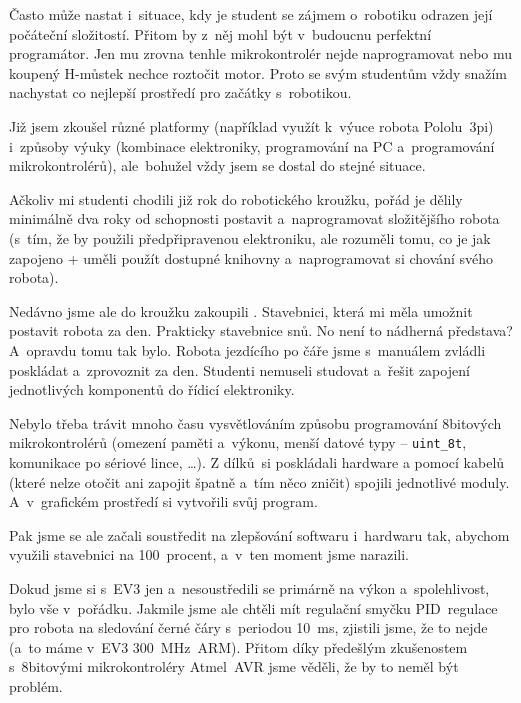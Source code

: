 Často může nastat i~situace, kdy je student se zájmem o~robotiku odrazen její počáteční složitostí.
Přitom by z~něj mohl být v~budoucnu perfektní programátor. 
Jen mu zrovna tenhle mikrokontrolér nejde naprogramovat nebo mu koupený H-můstek nechce roztočit motor.
Proto se svým studentům vždy snažím nachystat co nejlepší prostředí pro začátky s~robotikou. 

Již jsem zkoušel různé platformy (například využít k~výuce robota Pololu~3pi) i~způsoby výuky (kombinace elektroniky, programování na PC a~programování mikrokontrolérů), ale~bohužel vždy jsem se dostal do stejné situace. 

Ačkoliv mi studenti chodili již rok do robotického kroužku, pořád je dělily minimálně dva roky od schopnosti postavit a~naprogramovat složitějšího robota (s~tím, že by použili předpřipravenou elektroniku, ale rozuměli tomu, co je jak zapojeno + uměli použít dostupné knihovny a~naprogramovat si chování svého robota).

Nedávno jsme ale do kroužku zakoupili \legoEV{}. 
Stavebnici, která mi měla umožnit postavit robota za den. 
Prakticky stavebnice snů. No není to nádherná představa?
A~opravdu tomu tak bylo. Robota jezdícího po čáře jsme s~manuálem zvládli poskládat a~zprovoznit za den. 
Studenti nemuseli studovat a~řešit zapojení jednotlivých komponentů do řídicí elektroniky. 

Nebylo třeba trávit mnoho času vysvětlováním způsobu programování 8bitových mikrokontrolérů (omezení paměti a~výkonu, menší datové typy -- \verb|uint_8t|, komunikace po sériové lince, \dots). 
Z dílků~\lega{ }si poskládali hardware a pomocí kabelů (které nelze otočit ani zapojit špatně a~tím něco zničit) spojili jednotlivé moduly. A~v~grafickém prostředí si vytvořili svůj program.
% 
% 
%
%
%
%

Pak jsme se ale začali soustředit na zlepšování softwaru i~hardwaru tak, abychom využili stavebnici na 100~procent, a~v~ten moment jsme narazili.

Dokud jsme si s~EV3 jen  a~nesoustředili se primárně na výkon a~spolehlivost, bylo vše v~pořádku. 
Jakmile jsme ale chtěli mít regulační smyčku PID~regulace pro robota na sledování černé čáry s~periodou 10~ms, zjistili jsme, že to nejde (a~to máme v~EV3  300~MHz~ARM). Přitom díky předešlým zkušenostem s~8bitovými mikrokontroléry Atmel~AVR jsme věděli, že by to neměl být problém.


